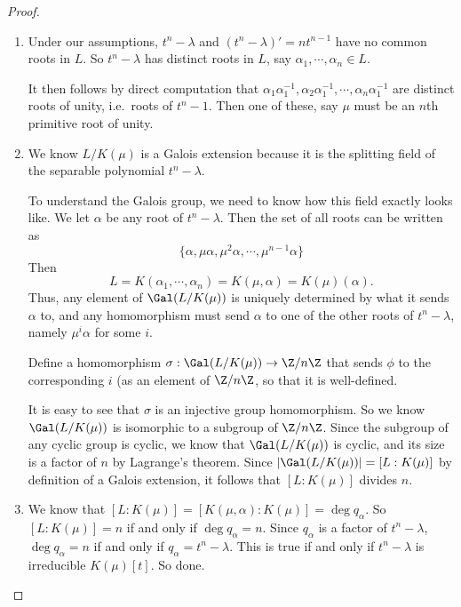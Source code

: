 \documentclass[a4paper]{article}
\begin{document}
\begin{proof}\leavevmode
  \begin{enumerate}
    \item Under our assumptions, $t^n - \lambda$ and $(t^n - \lambda)' = nt^{n - 1}$ have no common roots in $L$. So $t^n - \lambda$ has distinct roots in $L$, say $\alpha_1, \cdots, \alpha_n \in L$.

      It then follows by direct computation that $\alpha_1 \alpha_1^{-1}, \alpha_2 \alpha_1^{-1}, \cdots, \alpha_n \alpha_1^{-1}$ are distinct roots of unity, i.e.\ roots of $t^n - 1$. Then one of these, say $\mu$ must be an $n$th primitive root of unity.
    \item We know $L/K(\mu)$ is a Galois extension because it is the splitting field of the separable polynomial $t^n - \lambda$.

      To understand the Galois group, we need to know how this field exactly looks like. We let $\alpha$ be any root of $t^n - \lambda$. Then the set of all roots can be written as
      \[
        \{\alpha, \mu\alpha, \mu^2 \alpha, \cdots, \mu^{n - 1} \alpha\}
      \]
      Then
      \[
        L = K(\alpha_1, \cdots, \alpha_n) = K(\mu, \alpha) = K(\mu)(\alpha).
      \]
      Thus, any element of $\Gal(L/K(\mu))$ is uniquely determined by what it sends $\alpha$ to, and any homomorphism must send $\alpha$ to one of the other roots of $t^n - \lambda$, namely $\mu^i \alpha$ for some $i$.

      Define a homomorphism $\sigma: \Gal(L/K(\mu)) \to \Z/n\Z$ that sends $\phi$ to the corresponding $i$ (as an element of $\Z/n\Z$, so that it is well-defined.

      It is easy to see that $\sigma$ is an injective group homomorphism. So we know $\Gal(L/K(\mu))$ is isomorphic to a subgroup of $\Z/n\Z$. Since the subgroup of any cyclic group is cyclic, we know that $\Gal(L/K(\mu))$ is cyclic, and its size is a factor of $n$ by Lagrange's theorem. Since $|\Gal(L/K(\mu))| = [L:K(\mu)]$ by definition of a Galois extension, it follows that $[L:K(\mu)]$ divides $n$.

    \item We know that $[L:K(\mu)] = [K(\mu, \alpha): K(\mu)] = \deg q_\alpha$. So $[L:K(\mu)] = n$ if and only if $\deg q_\alpha = n$. Since $q_\alpha$ is a factor of $t^n - \lambda$, $\deg q_\alpha = n$ if and only if $q_\alpha = t^n - \lambda$. This is true if and only if $t^n - \lambda$ is irreducible $K(\mu)[t]$. So done.
  \end{enumerate}
\end{proof}
\end{document}
